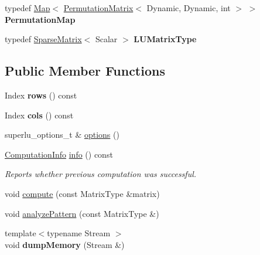 \begin{DoxyCompactItemize}
\item 
\mbox{\label{class_eigen_1_1_super_l_u_base_ac9c65a00757d1aec9655e3c89fe1a2a0}} 
typedef \mbox{\hyperlink{class_eigen_1_1_map}{Map}}$<$ \mbox{\hyperlink{class_eigen_1_1_permutation_matrix}{Permutation\+Matrix}}$<$ Dynamic, Dynamic, int $>$ $>$ {\bfseries Permutation\+Map}
\item 
\mbox{\label{class_eigen_1_1_super_l_u_base_a2a4f84d7bee23175a75b4934bb4c1f68}} 
typedef \mbox{\hyperlink{class_eigen_1_1_sparse_matrix}{Sparse\+Matrix}}$<$ Scalar $>$ {\bfseries L\+U\+Matrix\+Type}
\end{DoxyCompactItemize}
\subsection*{Public Member Functions}
\begin{DoxyCompactItemize}
\item 
\mbox{\label{class_eigen_1_1_super_l_u_base_a385c6d2d55f024034a02c45f66a88429}} 
Index {\bfseries rows} () const
\item 
\mbox{\label{class_eigen_1_1_super_l_u_base_a534fb98155d507aaa512032b32064444}} 
Index {\bfseries cols} () const
\item 
superlu\+\_\+options\+\_\+t \& \mbox{\hyperlink{class_eigen_1_1_super_l_u_base_a42d9d79073379f1e75b0f2c49879ed5b}{options}} ()
\item 
\mbox{\hyperlink{group__enums_ga85fad7b87587764e5cf6b513a9e0ee5e}{Computation\+Info}} \mbox{\hyperlink{class_eigen_1_1_super_l_u_base_aa67da5c8c24110931c949c5896c5ec03}{info}} () const
\begin{DoxyCompactList}\small\item\em Reports whether previous computation was successful. \end{DoxyCompactList}\item 
void \mbox{\hyperlink{class_eigen_1_1_super_l_u_base_a28cb3ef7914ecb6fdae1935b53f6be40}{compute}} (const Matrix\+Type \&matrix)
\item 
void \mbox{\hyperlink{class_eigen_1_1_super_l_u_base_a2d3f48425328d9b3cbdca369889007f3}{analyze\+Pattern}} (const Matrix\+Type \&)
\item 
\mbox{\label{class_eigen_1_1_super_l_u_base_a238acfa9eecf87b8e20d2aa4bba64ae5}} 
{\footnotesize template$<$typename Stream $>$ }\\void {\bfseries dump\+Memory} (Stream \&)
\end{DoxyCompactItemize}
